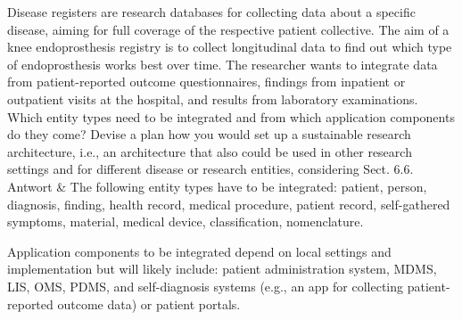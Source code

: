 Disease registers are research databases for collecting data about a specific disease, aiming for full coverage of the respective patient collective.
The aim of a knee endoprosthesis registry is to collect longitudinal data to find out which type of endoprosthesis works best over time.
The researcher wants to integrate data from patient-reported outcome questionnaires, findings from inpatient or outpatient visits at the hospital, and results from laboratory examinations.
Which entity types need to be integrated and from which application components do they come? Devise a plan how you would set up a sustainable research architecture, i.e., an architecture that also could be used in other research settings and for different disease or research entities, considering Sect. 6.6. \\
Antwort & The following entity types have to be integrated: patient, person, diagnosis, finding, health record, medical procedure, patient record, self-gathered symptoms, material, medical device, classification, nomenclature.

Application components to be integrated depend on local settings and implementation but will likely include: patient administration system, MDMS, LIS, OMS, PDMS, and self-diagnosis systems (e.g., an app for collecting patient-reported outcome data) or patient portals.

